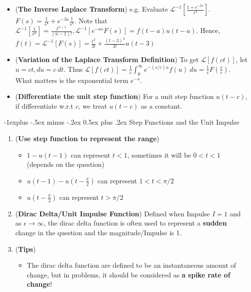 \documentclass[10pt, landscape]{article}
\makeatletter
\renewcommand{\subsection}{\@startsection{subsection}{2}{0mm}%
                                {-1explus -.5ex minus -.2ex}%
                                {0.5ex plus .2ex}%
                                {\normalfont\normalsize\bfseries}}
\makeatother
\begin{document}
\begin{multicols}{4}
\begin{enumerate}
\begin{itemize}
        \item (\textbf{The Inverse Laplace Transform}) e.g. Evaluate $\mathcal{L}^{-1}[\frac{1+e^{-3s}}{s^4}]$. $F(s)=\frac{1}{s^4}+e^{-3s}\frac{1}{s^4}$. Note that $\mathcal{L}^{-1}[\frac{1}{s^n}]=\frac{t^{n-1}}{(n-1)!}, \mathcal{L}^{-1}[e^{-as}F(s)]=f(t-a)u(t-a)$. Hence, $f(t)=\mathcal{L}^{-1}[F(s)]=\frac{t^3}{3!}+\frac{(t-3)^3}{3!}u(t-3)$
        \item (\textbf{Variation of the Laplace Transform Definition}) To get $\mathcal{L}[f(ct)]$, let $u=ct, du=c~dt$. Thus $\mathcal{L}[f(ct)]=\frac{1}{c}\int_{0}^{\infty}e^{-(s/c)u}f(u)~du=\frac{1}{c}F(\frac{s}{c})$. What matters is the exponential term $e^{\cdots s}$.
        \item (\textbf{Differentiate the unit step function}) For a unit step function $u(t-c)$, if differentiate w.r.t $c$, we treat $u(t-c)$ as a constant.
    \end{itemize}
\end{enumerate}
\subsection{Step Functions and the Unit Impulse}
\begin{enumerate}
    \item (\textbf{Use step function to represent the range})
    \begin{itemize}
        \item $1-u(t-1)$ can represent $t<1$, sometimes it will be $0<t<1$ (depends on the question)
        \item $u(t-1)-u(t-\frac{\pi}{2})$ can represent $1<t<\pi/2$
        \item $u(t-\frac{\pi}{2})$ can represent $t>\pi/2$
    \end{itemize}
    \item (\textbf{Dirac Delta/Unit Impulse Function}) Defined when Impulse $I=1$ and as $\epsilon\to\infty$, the dirac delta function is often used to represent a \textbf{sudden} change in the question and the magnitude/Impulse is 1.
    \item (\textbf{Tips})
    \begin{itemize}
        \item The dirac delta function are defined to be an instantaneous amount of change, but in problems, it should be considered as \textbf{a spike rate of change}!
    \end{itemize}
\end{enumerate}


\end{multicols}
\end{document}
